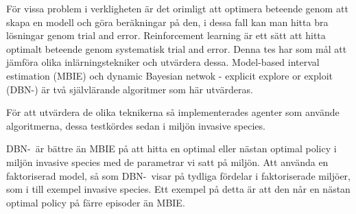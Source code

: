 För vissa problem i verkligheten är det orimligt att optimera beteende genom att skapa en modell och göra beräkningar på den, i dessa fall kan man hitta bra lösningar genom trial and error. Reinforcement learning är ett sätt att hitta optimalt beteende genom systematisk trial and error.
Denna tes har som mål att jämföra olika inlärningstekniker och utvärdera dessa.
Model-based interval estimation (MBIE) och dynamic Bayesian netwok - explicit explore or exploit (DBN-\etre) är 
två självlärande algoritmer som här utvärderas.

För att utvärdera de olika teknikerna så implementerades agenter som använde algoritmerna, dessa testkördes sedan 
i miljön invasive species.

DBN-\etre\ är bättre än MBIE på att hitta en optimal eller nästan optimal policy i miljön invasive species med de parametrar vi satt på miljön.
Att använda en faktoriserad model, så som DBN-\etre\, visar på tydliga fördelar i faktoriserade miljöer, som i till exempel invasive species. 
Ett exempel på detta är att den når en nästan optimal policy på färre episoder än MBIE.





